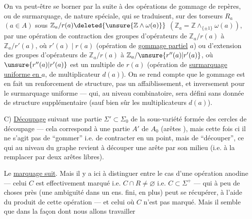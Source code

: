
On va peut-être se borner par la suite à des opérations de gommage de repères, ou de surmarquage, de nature spéciale, qui se traduisent, sur  des torseurs $R_a$ $(a\in A)$  sous
$\mathbb Z_a/r(a)\deleted{\unsure{\mathbb Z\mathbin{\wedge}\omega(a)}}$
$(\mathbb Z_a=\mathbb Z\mathbin{\wedge}_{\{\pm1\}}\omega(a))$,
par une opération de contraction des groupes d'opérateurs de $\mathbb Z_a/r(a)$ à $\mathbb Z_a/r'(a)$, où $r'(a)\mid r(a)$
(opération de \uline{gommage partiel}   $a$)
ou d'extension des groupes d'opérateurs de $\mathbb Z_a/r(a)$ à $\mathbb Z_a/\unsure{r''(a)|r'(a)}$, où $\unsure{r''(a)|r'(a)}$  est un multiple de $r(a)$
(opération de \uline{surmarquage uniforme en $a$}, \deleted{)} de multiplicateur $d(a)$).
On se rend compte  que le gommage  est en fait un renforcement de structure, pas un affaiblissement, et inversement pour le surmarquage uniforme --- qui, au niveau combinatoire, sera défini sans donnée de structure supplémentaire (sauf bien sûr les multiplicateurs $d(a)$).

C) \uline{Découpage}  suivant une partie 
$\Sigma'\subset\Sigma_0$ de la sous-variété formée des cercles de découpage --- cela correspond à une partie $A'$ de $A_0$ (arêtes  ), mais cette fois ci il ne s'agit pas de ``gommer'' i.e. de contracter en un point, mais de ``découper'', ce qui au niveau du graphe revient à découper une arête par son milieu (i.e. à la remplacer par deux arêtes libres).

Le \uline{marquage suit}. 
Mais il y a ici à distinguer entre le cas d'une opération anodine  --- celui
$C$ est effectivement marqué i.e. $C\cap R\ne\varnothing$ i.e. $C\subset\Sigma^+$ --- qui à peu de choses près (une ambiguïté dans un ens. fini, \deleted{)} en plus) peut se récupérer, à l'aide du produit de cette opération --- et celui où $C$ n'est pas marqué.
Mais il semble que dans la façon dont nous allons travailler

